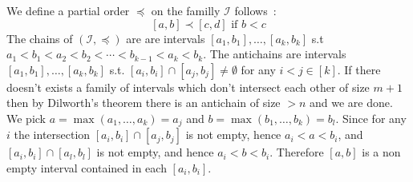 \documentclass[a4paper,11pt]{exam}
\begin{document}
\begin{questions}
\begin{enumerate}
			\newcommand{\I}{\mathcal{I}}
			
			\begin{solution}
				We define a partial order $\preceq$ on the familly $\I$ follows~:
				\[
				[a,b] \prec [c,d] \text{ if } b<c
				\]
				The chains of $(\I,\preceq)$ are are intervals $[a_1,b_1], \dots, [a_k,b_k]$ s.t $a_1 < b_1 < a_2 < b_2 < \cdots < b_{k-1} < a_k < b_k$.
				The antichains are intervals $[a_1,b_1], \dots, [a_k,b_k]$ s.t. $[a_i,b_i] \cap [a_j,b_j]\neq \emptyset$ for any $i<j\in[k]$. 
				If there doesn't exists a family of intervals which don't intersect each other of size $m+1$ then by Dilworth's theorem there is an antichain of size $>n$ and we are done. We pick $a = \max(a_1, \dots, a_k)=a_j$ and $b = \max(b_1, \dots, b_k)=b_l$. Since for any $i$ the intersection $[a_i,b_i] \cap [a_j,b_j]$ is not empty, hence $a_i < a < b_i$, and $[a_i,b_i] \cap [a_l,b_l]$ is not empty, and hence $a_i < b < b_i$.
				Therefore $[a,b]$ is a non empty interval contained in each $[a_i,b_i]$.
				
				
				
				
				
			\end{solution}
		\end{enumerate}
		

\end{questions}
\end{document}
